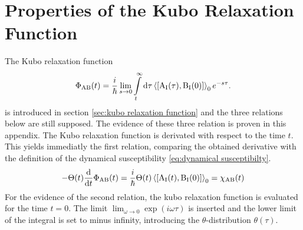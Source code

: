 %
%
\chapter{Properties of the Kubo Relaxation Function}
\label{app:properties of the Kubo relaxation function}
%
%
The Kubo relaxation function 
%
\begin{align}
	\Phi_{\mt{AB}}(t) = \frac{i}{\hbar} \lim\limits_{s \to 0} \int\limits_{t}^{\infty} \dd{\tau} \expval{\comm{\mt{A}_{\mt{I}}(\tau)}{\mt{B}_{\mt{I}}(0)}}_{0} e^{-s\tau}.
	\label{appeq:Kubo relaxation function}
\end{align}
%
is introduced in section \ref{sec:kubo relaxation function} and the three relations below are still supposed.
%
%
The evidence of these three relation is proven in this appendix.
The Kubo relaxation function is derivated with respect to the time $t$.
This yields immediatly the first relation, comparing the obtained derivative with the definition of the dynamical susceptibility \eqref{eq:dynamical susceptibilty}.
%
\begin{align}
	-\Theta(t) \dv{t} \Phi_{\mt{AB}}(t) = \frac{i}{\hbar} \Theta(t) \expval{\comm{\mt{A}_{\mt{I}}(t)}{\mt{B}_{\mt{I}}(0)}}_{0} = \chi_{\mt{AB}}(t)
	\label{eq:proof relation 1}
\end{align}
%
For the evidence of the second relation, the kubo relaxation function is evaluated for the time $t=0$.
The limit $\lim_{\omega\to0} \exp(i\omega \tau)$ is inserted and the lower limit of the integral is set to minus infinity, introducing the $\theta$-distribution $\theta(\tau)$.
